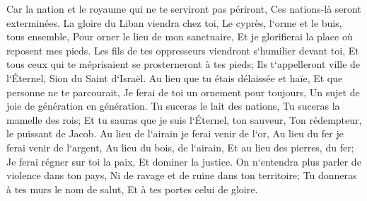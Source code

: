 \verse Car la nation et le royaume qui ne te serviront pas périront, Ces nations-là seront exterminées. 
\verse La gloire du Liban viendra chez toi, Le cyprès, l`orme et le buis, tous ensemble, Pour orner le lieu de mon sanctuaire, Et je glorifierai la place où reposent mes pieds. 
\verse Les fils de tes oppresseurs viendront s`humilier devant toi, Et tous ceux qui te méprisaient se prosterneront à tes pieds; Ils t`appelleront ville de l`Éternel, Sion du Saint d`Israël. 
\verse Au lieu que tu étais délaissée et haïe, Et que personne ne te parcourait, Je ferai de toi un ornement pour toujours, Un sujet de joie de génération en génération. 
\verse Tu suceras le lait des nations, Tu suceras la mamelle des rois; Et tu sauras que je suis l`Éternel, ton sauveur, Ton rédempteur, le puissant de Jacob. 
\verse Au lieu de l`airain je ferai venir de l`or, Au lieu du fer je ferai venir de l`argent, Au lieu du bois, de l`airain, Et au lieu des pierres, du fer; Je ferai régner sur toi la paix, Et dominer la justice. 
\verse On n`entendra plus parler de violence dans ton pays, Ni de ravage et de ruine dans ton territoire; Tu donneras à tes murs le nom de salut, Et à tes portes celui de gloire. 
